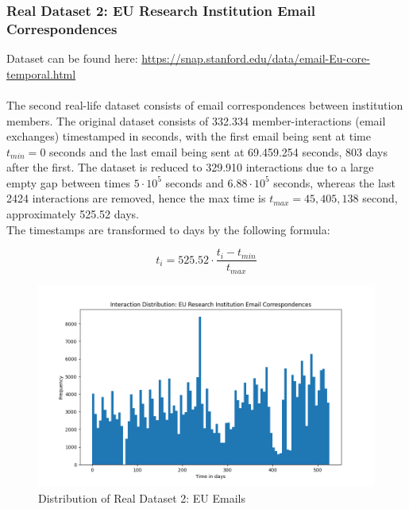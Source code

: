 \subsubsection{Real Dataset 2: EU Research Institution Email Correspondences}
\label{sec:Method:Reproducibility:RealDataset2}
Dataset can be found here: \href{https://snap.stanford.edu/data/email-Eu-core-temporal.html}{https://snap.stanford.edu/data/email-Eu-core-temporal.html}
\\\\
The second real-life dataset consists of email correspondences between institution members.
The original dataset consists of 332.334 member-interactions (email exchanges) timestamped in seconds, with the first email being sent at time $t_{min} = 0$ seconds and the last email being sent at 69.459.254 seconds, 803 days after the first.
The dataset is reduced to 329.910 interactions due to a large empty gap between times $5 \cdot 10^5$ seconds and $6.88 \cdot 10^5$ seconds, whereas the last 2424 interactions are removed, hence the max time is $t_{max} = 45,405,138$ second, approximately 525.52 days.
\\
The timestamps are transformed to days by the following formula:

\begin{equation}
    t_i = 525.52 \cdot \frac{t_i - t_{min}}{t_{max}}
\end{equation}

\begin{figure}[H]
    \centering
    \includegraphics[width=\textwidth]{0_images/reallife_dataset_2_dist.png}
    \caption{Distribution of Real Dataset 2: EU Emails}
    \label{fig:RLdataset2}
\end{figure}



